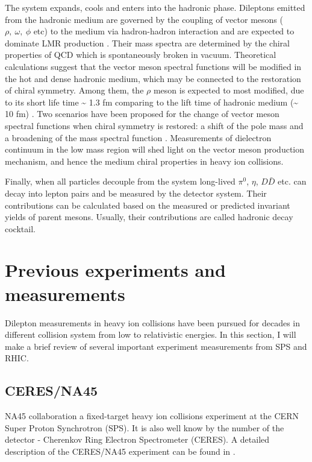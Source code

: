The system expands, cools and enters into the hadronic phase. Dileptons
emitted from the hadronic medium are governed by the coupling of vector
mesons ($\rho,\:\omega,\:\phi$ etc) to the medium via hadron-hadron
interaction and are expected to dominate LMR production \cite{R.-Rapp:2000uq}.
Their mass spectra are determined by the chiral properties of QCD
which is spontaneously broken in vacuum. Theoretical calculations
suggest that the vector meson spectral functions will be modified
in the hot and dense hadronic medium, which may be connected to the
restoration of chiral symmetry. Among them, the $\rho$ meson is expected
to most modified, due to its short life time \textasciitilde{} 1.3
fm comparing to the lift time of hadronic medium (\textasciitilde{}
10 fm) \cite{Pisarski1982155}. Two scenarios have been proposed for
the change of vector meson spectral functions when chiral symmetry
is restored: a shift of the pole mass \cite{Brown1996333} and a broadening
of the mass spectral function \cite{Rapp:1999kx}. Measurements of
dielectron continuum in the low mass region will shed light on the
vector meson production mechanism, and hence the medium chiral properties
in heavy ion collisions.

Finally, when all particles decouple from the system long-lived $\pi^{0}$,
$\eta$, $D\bar{D}$ etc. can decay into lepton pairs and be measured
by the detector system. Their contributions can be calculated based
on the measured or predicted invariant yields of parent mesons. Usually,
their contributions are called hadronic decay cocktail.


\section{Previous experiments and measurements}

Dilepton measurements in heavy ion collisions have been pursued for
decades in different collision system from low to relativistic energies\cite{PhysRevLett.75.1272}.
In this section, I will make a brief review of several important experiment
measurements from SPS and RHIC.


\subsection{CERES/NA45}

NA45 collaboration a fixed-target heavy ion collisions experiment
at the CERN Super Proton Synchrotron (SPS). It is also well know by
the number of the detector - Cherenkov Ring Electron Spectrometer
(CERES). A detailed description of the CERES/NA45 experiment can be
found in \cite{Baur199487}. 

